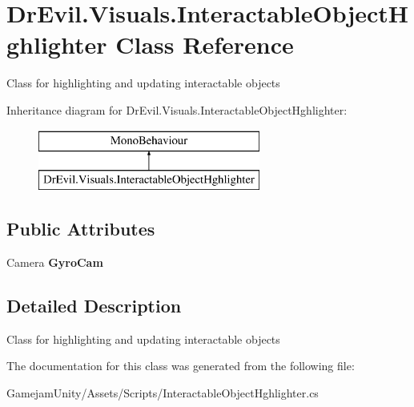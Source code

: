 \hypertarget{class_dr_evil_1_1_visuals_1_1_interactable_object_hghlighter}{}\section{Dr\+Evil.\+Visuals.\+Interactable\+Object\+Hghlighter Class Reference}
\label{class_dr_evil_1_1_visuals_1_1_interactable_object_hghlighter}


Class for highlighting and updating interactable objects  


Inheritance diagram for Dr\+Evil.\+Visuals.\+Interactable\+Object\+Hghlighter\+:\begin{figure}[H]
\begin{center}
\leavevmode
\includegraphics[height=2.000000cm]{class_dr_evil_1_1_visuals_1_1_interactable_object_hghlighter}
\end{center}
\end{figure}
\subsection*{Public Attributes}
\begin{DoxyCompactItemize}
\item 
\mbox{\label{class_dr_evil_1_1_visuals_1_1_interactable_object_hghlighter_a2231ad7c16ddcaea6f61cd42f75ce402}} 
Camera {\bfseries Gyro\+Cam}
\end{DoxyCompactItemize}


\subsection{Detailed Description}
Class for highlighting and updating interactable objects 



The documentation for this class was generated from the following file\+:\begin{DoxyCompactItemize}
\item 
Gamejam\+Unity/\+Assets/\+Scripts/Interactable\+Object\+Hghlighter.\+cs\end{DoxyCompactItemize}

